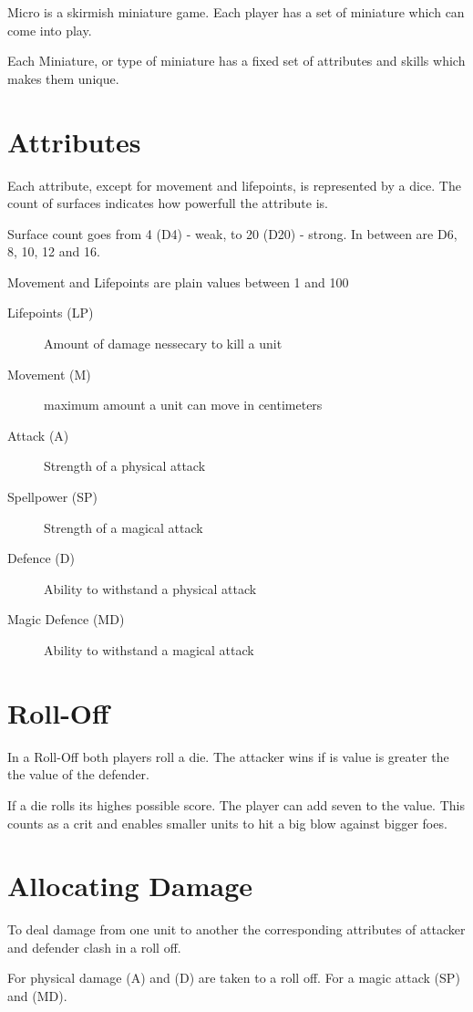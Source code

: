 \documentclass[a5paper,pagesize,10pt,bibtotoc,pointlessnumbers,
normalheadings,DIV=9,twoside=false]{scrbook}
\begin{document}
Micro is a skirmish miniature game. Each player has a set of miniature which can come into play.

Each Miniature, or type of miniature has a fixed set of attributes and skills which makes them unique.

\section{Attributes}
Each attribute, except for movement and lifepoints, is represented by a dice. The count of surfaces indicates how powerfull the attribute is.

Surface count goes from 4 (D4) - weak, to 20 (D20) - strong. In between are D6, 8, 10, 12 and 16.

Movement and Lifepoints are plain values between 1 and 100

\begin{description}
\item[Lifepoints (LP)]
Amount of damage nessecary to kill a unit
\item[Movement (M)]
maximum amount a unit can move in centimeters
\item[Attack (A)]
Strength of a physical attack
\item[Spellpower (SP)]
Strength of a magical attack
\item[Defence (D)]
Ability to withstand a physical attack
\item[Magic Defence (MD)]
Ability to withstand a magical attack
\end{description}

\section{Roll-Off}
In a Roll-Off both players roll a die. The attacker wins if is value is greater the the value of the defender.

If a die rolls its highes possible score. The player can add seven to the value. This counts as a crit and enables smaller units to hit a big blow against bigger foes.

\section{Allocating Damage}
To deal damage from one unit to another the corresponding attributes of attacker and defender clash in a roll off.

For physical damage (A) and (D) are taken to a roll off. For a magic attack (SP) and (MD).
\end{document}
